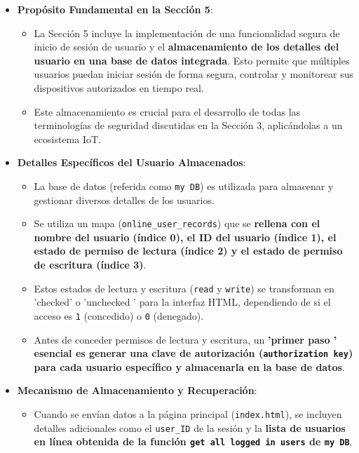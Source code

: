 \documentclass{report}
\begin{document}
\begin{itemize}
    \item \textbf{Propósito Fundamental en la Sección 5}:
    \begin{itemize}
        \item La Sección 5 incluye la implementación de una funcionalidad segura de inicio de sesión de usuario y el \textbf{almacenamiento de los 
        detalles del usuario en una base de datos integrada}. Esto permite que múltiples usuarios puedan iniciar sesión de forma segura, controlar 
        y monitorear sus dispositivos autorizados en tiempo real.
        \item Este almacenamiento es crucial para el desarrollo de todas las terminologías de seguridad discutidas en la Sección 3, aplicándolas 
        a un ecosistema IoT.
    \end{itemize}
    \item \textbf{Detalles Específicos del Usuario Almacenados}:
    \begin{itemize}
    \item La base de datos (referida como \texttt{my DB}) es utilizada para almacenar y gestionar diversos detalles de los usuarios.
        \item Se utiliza un mapa (\verb|online_user_records|) que se \textbf{rellena con el nombre del usuario (índice 0), el ID del usuario (índice 1), 
        el estado de permiso de lectura (índice 2) y el estado de permiso de escritura (índice 3)}.
        \item Estos estados de lectura y escritura (\texttt{read} y \texttt{write}) se transforman en 'checked' o  'unchecked ' para la interfaz HTML, 
        dependiendo de si el acceso es \texttt{1} (concedido) o \texttt{0} (denegado).
        \item Antes de conceder permisos de lectura y escritura, un \textbf{ 'primer paso ' esencial es generar una clave de autorización 
        (\texttt{authorization key}) para cada usuario específico y almacenarla en la base de datos}.
    \end{itemize}
    \item \textbf{Mecanismo de Almacenamiento y Recuperación}:
    \begin{itemize}
        \item Cuando se envían datos a la página principal (\verb|index.html|), se incluyen detalles adicionales como el \verb|user_ID| de la sesión y 
        la \textbf{lista de usuarios en línea obtenida de la función \texttt{get all logged in users} de \texttt{my DB}}.

\end{itemize}
\end{itemize}
\end{document}
